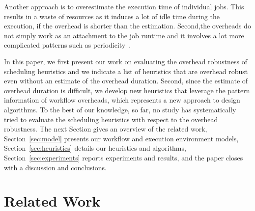 \documentclass[final]{IEEEtran}
\begin{document}
Another approach is to overestimate the execution time of individual jobs. This results in a waste of resources as it induces a lot of idle time during the execution, if the overhead is shorter than the estimation. Second,the overheads do not simply work as an attachment to the job runtime and it involves a lot more complicated patterns such as periodicity~\cite{Chen}. 

In this paper, we first present our work on evaluating the overhead robustness of scheduling heuristics and we indicate a list of heuristics that are overhead robust even without an estimate of the overhead duration. Second, since the estimate of overhead duration is difficult, we develop new heuristics that leverage the pattern information of workflow overheads, which  represents a new approach to design algorithms. To the best of our knowledge, so far, no study has systematically tried to evaluate the scheduling heuristics with respect to the overhead robustness.  
The next Section gives an overview of the related work, Section~\ref{sec:model} presents our workflow and execution environment models, Section~\ref{sec:heuristics} details our heuristics and algorithms, Section~\ref{sec:experiments} reports experiments and results, and the paper closes with a discussion and conclusions.



\section{Related Work}
\end{document}
